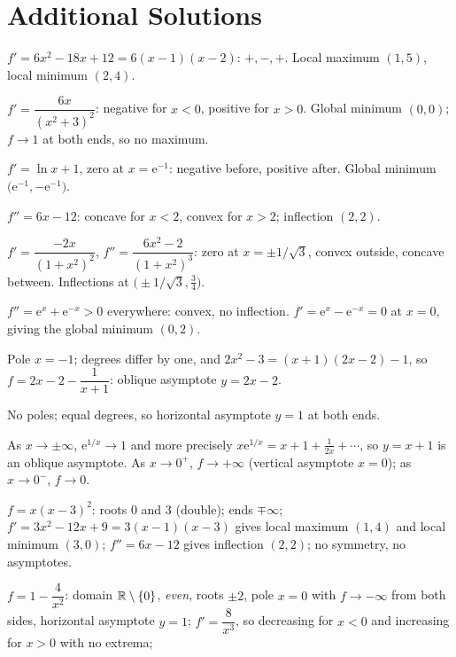 \section{Additional Solutions}

\begin{solutions}
  \item $f'=6x^{2}-18x+12=6(x-1)(x-2)$: $+,-,+$. Local maximum $(1,5)$,
        local minimum $(2,4)$.
  \item $f'=\dfrac{6x}{(x^{2}+3)^{2}}$: negative for $x<0$, positive for
        $x>0$. Global minimum $(0,0)$; $f\to1$ at both ends, so no
        maximum.
  \item $f'=\ln x+1$, zero at $x=\mathrm{e}^{-1}$: negative before,
        positive after. Global minimum
        $\bigl(\mathrm{e}^{-1},-\mathrm{e}^{-1}\bigr)$.
  \item $f''=6x-12$: concave for $x<2$, convex for $x>2$; inflection
        $(2,2)$.
  \item $f'=\dfrac{-2x}{(1+x^{2})^{2}}$,
        $f''=\dfrac{6x^{2}-2}{(1+x^{2})^{3}}$: zero at
        $x=\pm1/\sqrt3$, convex outside, concave between. Inflections at
        $\bigl(\pm1/\sqrt3,\tfrac34\bigr)$.
  \item $f''=\mathrm{e}^{x}+\mathrm{e}^{-x}>0$ everywhere: convex, no
        inflection. $f'=\mathrm{e}^{x}-\mathrm{e}^{-x}=0$ at $x=0$, giving
        the global minimum $(0,2)$.
  \item Pole $x=-1$; degrees differ by one, and
        $2x^{2}-3=(x+1)(2x-2)-1$, so $f=2x-2-\dfrac{1}{x+1}$: oblique
        asymptote $y=2x-2$.
  \item No poles; equal degrees, so horizontal asymptote $y=1$ at both
        ends.
  \item As $x\to\pm\infty$, $\mathrm{e}^{1/x}\to1$ and more precisely
        $x\mathrm{e}^{1/x}=x+1+\tfrac{1}{2x}+\cdots$, so $y=x+1$ is an
        oblique asymptote. As $x\to0^{+}$, $f\to+\infty$ (vertical
        asymptote $x=0$); as $x\to0^{-}$, $f\to0$.
  \item $f=x(x-3)^{2}$: roots $0$ and $3$ (double); ends $\mp\infty$;
        $f'=3x^{2}-12x+9=3(x-1)(x-3)$ gives local maximum $(1,4)$ and local
        minimum $(3,0)$; $f''=6x-12$ gives inflection $(2,2)$; no
        symmetry, no asymptotes.
  \item $f=1-\dfrac{4}{x^{2}}$: domain $\mathbb{R}\setminus\{0\}$, \emph{even},
        roots $\pm2$, pole $x=0$ with $f\to-\infty$ from both sides,
        horizontal asymptote $y=1$; $f'=\dfrac{8}{x^{3}}$, so decreasing
        for $x<0$ and increasing for $x>0$ with no extrema;

\end{solutions}
